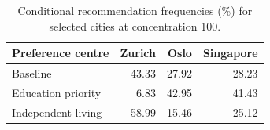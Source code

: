 \begin{table}[htbp]\centering
\caption{Conditional recommendation frequencies (\%) for selected cities at concentration 100.}
\begin{tabular}{lrrr}\toprule
Preference centre & Zurich & Oslo & Singapore\\\midrule
Baseline & 43.33 & 27.92 & 28.23 \\
Education priority & 6.83 & 42.95 & 41.43 \\
Independent living & 58.99 & 15.46 & 25.12 \\
\bottomrule\end{tabular}\end{table}
